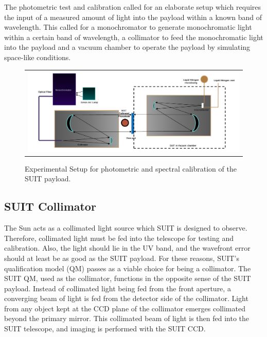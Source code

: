 \documentclass[12pt]{spieman}  %
\begin{document}
The photometric test and calibration called for an elaborate setup which requires the input of a measured amount of light into the payload within a known band of wavelength. This called for a monochromator to generate monochromatic light within a certain band of wavelength, a collimator to feed the monochromatic light into the payload and a vacuum chamber to operate the payload by simulating space-like conditions.

\begin{figure}[ht!]
\begin{center}
\begin{tabular}{c}
\includegraphics[trim={2.5cm 0 1.5cm 1.5cm},clip,width=\linewidth]{experimental_setup}
\end{tabular}
\end{center}
\caption 
{ \label{fig:experimentalsetup} Experimental Setup for photometric and spectral calibration of the SUIT payload.} 
\end{figure}
 
\subsection{SUIT Collimator}		
The Sun acts as a collimated light source which SUIT is designed to observe. Therefore, collimated light must be fed into the telescope for testing and calibration. Also, the light should lie in the UV band, and the wavefront error should at least be as good as the SUIT payload. For these reasons, SUIT's qualification model (QM) passes as a viable choice for being a collimator. The SUIT QM, used as the collimator, functions in the opposite sense of the SUIT payload. Instead of collimated light being fed from the front aperture, a converging beam of light is fed from the detector side of the collimator. Light from any object kept at the  CCD plane of the collimator emerges collimated beyond the primary mirror. This collimated beam of light is then fed into the SUIT telescope, and imaging is performed with the SUIT CCD.
	
\end{document}

